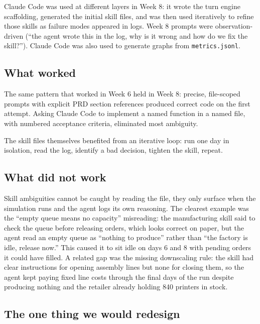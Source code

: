 \documentclass[
]{article}
\newcounter{none} %
\begin{document}
Claude Code was used at different layers in Week 8: it wrote the turn
engine scaffolding, generated the initial skill files, and was then used
iteratively to refine those skills as failure modes appeared in logs.
Week 8 prompts were observation-driven (``the agent wrote this in the
log, why is it wrong and how do we fix the skill?''). Claude Code was
also used to generate graphs from \texttt{metrics.jsonl}.

\subsection{What worked}\label{what-worked}

The same pattern that worked in Week 6 held in Week 8: precise,
file-scoped prompts with explicit PRD section references produced
correct code on the first attempt. Asking Claude Code to implement a
named function in a named file, with numbered acceptance criteria,
eliminated most ambiguity.

The skill files themselves benefited from an iterative loop: run one day
in isolation, read the log, identify a bad decision, tighten the skill,
repeat.

\subsection{What did not work}\label{what-did-not-work}

Skill ambiguities cannot be caught by reading the file, they only
surface when the simulation runs and the agent logs its own reasoning.
The clearest example was the ``empty queue means no capacity''
misreading: the manufacturing skill said to check the queue before
releasing orders, which looks correct on paper, but the agent read an
empty queue as ``nothing to produce'' rather than ``the factory is idle,
release now.'' This caused it to sit idle on days 6 and 8 with pending
orders it could have filled. A related gap was the missing downscaling
rule: the skill had clear instructions for opening assembly lines but
none for closing them, so the agent kept paying fixed line costs through
the final days of the run despite producing nothing and the retailer
already holding 840 printers in stock.

\subsection{The one thing we would
redesign}\label{the-one-thing-we-would-redesign}
\end{document}
